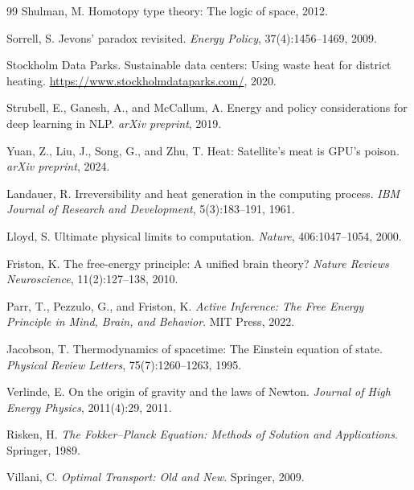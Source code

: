 \documentclass[11pt,a4paper]{article}
\theoremstyle{plain}
\theoremstyle{definition}
\theoremstyle{remark}
\begin{document}
\begin{thebibliography}{99}
Shulman, M.
\newblock Homotopy type theory: The logic of space, 2012.

Sorrell, S.
\newblock Jevons' paradox revisited.
\newblock \emph{Energy Policy}, 37(4):1456--1469, 2009.

Stockholm Data Parks.
\newblock Sustainable data centers: Using waste heat for district heating.
\newblock \url{https://www.stockholmdataparks.com/}, 2020.

Strubell, E., Ganesh, A., and McCallum, A.
\newblock Energy and policy considerations for deep learning in NLP\@.
\newblock \emph{arXiv preprint}, 2019.

Yuan, Z., Liu, J., Song, G., and Zhu, T.
\newblock Heat: Satellite's meat is GPU's poison.
\newblock \emph{arXiv preprint}, 2024.

Landauer, R.
\newblock Irreversibility and heat generation in the computing process.
\newblock \emph{IBM Journal of Research and Development}, 5(3):183--191, 1961.

Lloyd, S.
\newblock Ultimate physical limits to computation.
\newblock \emph{Nature}, 406:1047--1054, 2000.

Friston, K.
\newblock The free-energy principle: A unified brain theory?
\newblock \emph{Nature Reviews Neuroscience}, 11(2):127--138, 2010.

Parr, T., Pezzulo, G., and Friston, K.
\newblock \emph{Active Inference: The Free Energy Principle in Mind, Brain, and
  Behavior}.
\newblock MIT Press, 2022.

Jacobson, T.
\newblock Thermodynamics of spacetime: The Einstein equation of state.
\newblock \emph{Physical Review Letters}, 75(7):1260--1263, 1995.

Verlinde, E.
\newblock On the origin of gravity and the laws of Newton.
\newblock \emph{Journal of High Energy Physics}, 2011(4):29, 2011.

Risken, H.
\newblock \emph{The Fokker--Planck Equation: Methods of Solution and
  Applications}.
\newblock Springer, 1989.

Villani, C.
\newblock \emph{Optimal Transport: Old and New}.
\newblock Springer, 2009.


\end{thebibliography}
\end{document}
